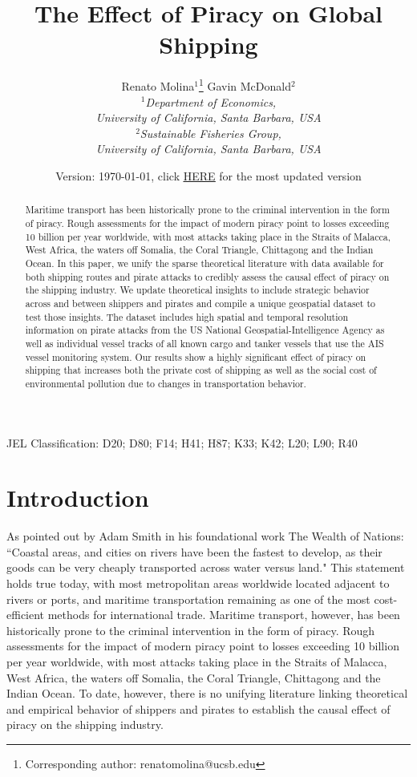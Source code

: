 \documentclass[11pt, oneside]{article}   	%
\title{The Effect of Piracy on Global Shipping}
\author
       {Renato Molina$^{1}$\thanks{Corresponding author: renatomolina@ucsb.edu} \qquad Gavin McDonald$^{2}$\\
       \small{\emph{$^1$Department of Economics,}} \\
       \small{\emph{University of California, Santa Barbara, USA}}\\
       \small{\emph{$^2$Sustainable Fisheries Group,}} \\
       \small{\emph{University of California, Santa Barbara, USA}}
       }
\date{Version: \today, click \href{https://ucsb.box.com/s/yn7a14y7d1c0d8bsimj0ire2w6c9kr6p}{\underline{HERE}} for the most updated version}
\begin{document}
\maketitle
\begin{abstract}
Maritime transport has been historically prone to the criminal intervention in the form of piracy. Rough assessments for the impact of modern piracy point to losses exceeding 10 billion per year worldwide, with most attacks taking place in the Straits of Malacca, West Africa, the waters off Somalia, the Coral Triangle, Chittagong and the Indian Ocean. In this paper, we unify the sparse theoretical literature with data available for both shipping routes and pirate attacks to credibly assess the causal effect of piracy on the shipping industry. We update theoretical insights to include strategic behavior across and between shippers and pirates and compile a unique geospatial dataset to test those insights. The dataset includes high spatial and temporal resolution information on pirate attacks from the US National Geospatial-Intelligence Agency as well as individual vessel tracks of all known cargo and tanker vessels that use the AIS vessel monitoring system. Our results show a highly significant effect of piracy on shipping that increases both the private cost of shipping as well as the social cost of environmental pollution due to changes in transportation behavior. 
\end{abstract}
JEL Classification: D20; D80; F14; H41; H87; K33; K42; L20; L90; R40\\
\hfill
\pagebreak


\section{Introduction}
 As pointed out by Adam Smith in his foundational work The Wealth of Nations: ``Coastal areas, and cities on rivers have been the fastest to develop, as their goods can be very cheaply transported across water versus land." This statement holds true today, with most metropolitan areas worldwide located adjacent to rivers or ports, and maritime transportation remaining as one of the most cost-efficient methods for international trade. Maritime transport, however, has been historically prone to the criminal intervention in the form of piracy. Rough assessments for the impact of modern piracy point to losses exceeding 10 billion per year worldwide, with most attacks taking place in the Straits of Malacca, West Africa, the waters off Somalia, the Coral Triangle, Chittagong and the Indian Ocean. To date, however, there is no unifying literature linking theoretical and empirical behavior of shippers and pirates to establish the causal effect of piracy on the shipping industry.
\end{document}
